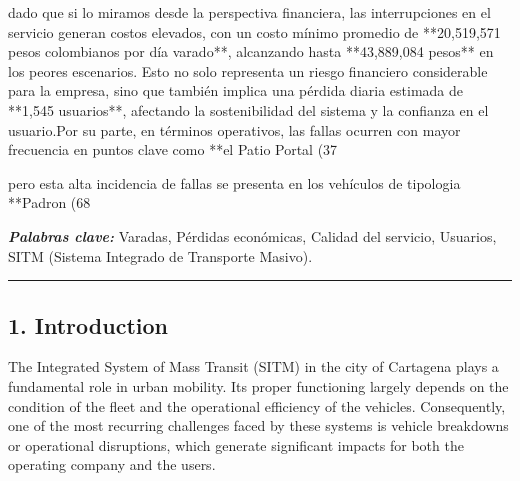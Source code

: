 \documentclass[
  letterpaper,
  DIV=11,
  numbers=noendperiod]{scrartcl}
\begin{document}
\begin{@twocolumnfalse}
dado que si lo miramos desde la perspectiva financiera, las interrupciones en el servicio generan costos elevados, con un costo mínimo promedio de **20,519,571 pesos colombianos por día varado**, alcanzando hasta **43,889,084 pesos** en los peores escenarios. Esto no solo representa un riesgo financiero considerable para la empresa, sino que también implica una pérdida diaria estimada de **1,545 usuarios**, afectando la sostenibilidad del sistema y la confianza en el usuario.Por su parte, en términos operativos, las fallas ocurren con mayor frecuencia en puntos clave como **el Patio Portal (37%

pero esta  alta incidencia  de fallas se presenta en los vehículos de tipologia **Padron (68%


\textbf{\textit{Palabras clave:}}
Varadas, Pérdidas económicas, Calidad del servicio, Usuarios, SITM (Sistema Integrado de Transporte Masivo).


\begin{center}\rule{12cm}{0.3mm} \end{center}
\end{@twocolumnfalse}

\subsection{1. Introduction}\label{introduction}

The Integrated System of Mass Transit (SITM) in the city of Cartagena
plays a fundamental role in urban mobility. Its proper functioning
largely depends on the condition of the fleet and the operational
efficiency of the vehicles. Consequently, one of the most recurring
challenges faced by these systems is vehicle breakdowns or operational
disruptions, which generate significant impacts for both the operating
company and the users.
\end{document}
